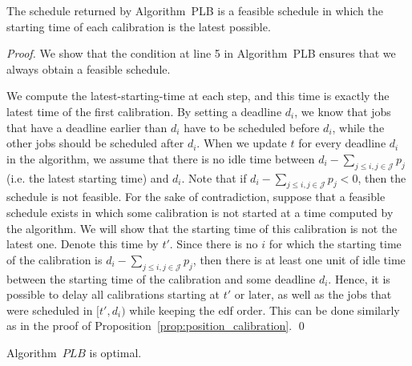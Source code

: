 \begin{prop}\label{prop:algo_latest_starting_time}
The schedule returned by Algorithm~PLB is a feasible schedule in
which the starting time of each calibration is the latest possible.
\end{prop}

\begin{proof}
We show that the condition at line 5 in Algorithm~PLB ensures 
that we always obtain a feasible schedule.

We compute the latest-starting-time at each step, and this time is exactly the latest time of the first calibration. By setting a deadline $d_i$, we know that jobs that have a deadline earlier than $d_i$ have to be scheduled before $d_i$, while the other jobs should be scheduled after $d_i$. When we update $t$ for every deadline $d_i$ in the algorithm, we assume that there is no idle time between $d_i-\sum_{j\leq i,j\in \mathcal{J}}p_j$ (i.e. the latest starting time) and $d_i$. Note that if $d_i-\sum_{j\leq i,j\in \mathcal{J}}p_j<0$, then the schedule is not feasible. For the sake of contradiction, suppose that a feasible schedule exists in which some calibration is not started at a time computed by the algorithm. We will show that the starting time of this calibration is not the latest one. Denote this time by $t'$.
Since there is no $i$ for which the starting time of the calibration is  $d_i -\sum_{j\leq i,j\in \mathcal{J}}p_j $, then there is at least one unit of idle time between the starting time of the calibration and some deadline $d_i$. Hence, it is possible to delay all calibrations starting at $t'$ or later, as well as the jobs that were scheduled in $[t',d_i)$ while keeping the {\sc edf} order. This can be done similarly as in the proof of Proposition~\ref{prop:position_calibration}.
\qed\end{proof}


\begin{prop}
Algorithm~$PLB$ is optimal.
\end{prop}


